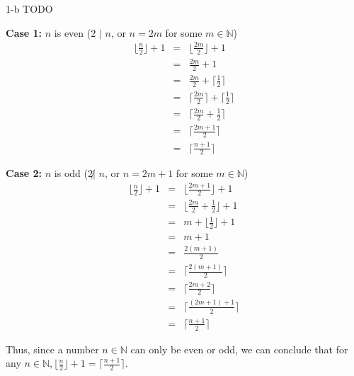 \documentclass[11pt]{article}
\begin{document}
\begin{prob}{1-b}
TODO
\end{prob}
\begin{sol}
\textbf{Case 1:} $n$ is even ($2$ $|$ $n$, or $n = 2m$ for some $m \in \mathbb{N}$) 
\begin{eqnarray*}
\lfloor\frac{n}{2} \rfloor + 1 & = & \lfloor\frac{2m}{2} \rfloor + 1\\
& = & \frac{2m}{2} + 1 \\
& = & \frac{2m}{2} + \lceil\frac{1}{2}\rceil \\
& = & \lceil\frac{2m}{2}\rceil + \lceil\frac{1}{2}\rceil \\
& = & \lceil\frac{2m}{2} + \frac{1}{2}\rceil \\
& = & \lceil \frac{2m + 1}{2} \rceil \\
& = & \lceil\frac{n+1}{2} \rceil
\end{eqnarray*}

\textbf{Case 2:} $n$ is odd ($2 \not|$  $n$, or $n = 2m + 1$ for some $m \in \mathbb{N}$) \\
\begin{eqnarray*}
\lfloor\frac{n}{2}\rfloor + 1 & = & \lfloor\frac{2m+1}{2}\rfloor + 1 \\
& = & \lfloor\frac{2m}{2} + \frac{1}{2}\rfloor + 1 \\
& = & m + \lfloor\frac{1}{2}\rfloor + 1 \\
& = & m + 1 \\
& = & \frac{2(m+1)}{2} \\
& = & \lceil\frac{2(m+1)}{2}\rceil \\
& = & \lceil\frac{2m + 2}{2}\rceil \\
& = & \lceil\frac{(2m + 1) + 1}{2}\rceil \\
& = & \lceil\frac{n+1}{2}\rceil
\end{eqnarray*}

Thus, since a number $n \in \mathbb{N}$ can only be even or odd, we can conclude that for any $n \in \mathbb{N}, \lfloor\frac{n}{2}\rfloor + 1 = \lceil\frac{n+1}{2}\rceil$.
\end{sol}
\end{document}
